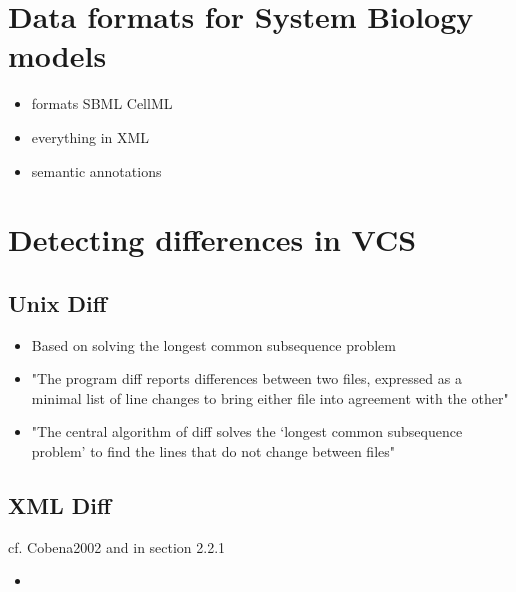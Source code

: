 \section{Data formats for System Biology models}
	\begin{itemize}
		\item formats
		\subitem SBML
		\subitem CellML
		\subitem \sedml
		\item everything in XML
		\item semantic annotations
	\end{itemize}

\section{Detecting differences in VCS}
	\subsection{Unix Diff}
	\begin{itemize}
		\item Based on solving the longest common subsequence problem
		\item "The program diff reports differences between two files, expressed as a minimal list of line changes to bring either file into agreement with the other" \cite{Hunt1976}
		\item "The central algorithm of diff solves the ‘longest common subsequence problem’ to find the lines that do not change between files" \cite{Hunt1976}
	\end{itemize}
	
	\subsection{XML Diff}
	cf. Cobena2002 and \cite{Waltemath2013} in section 2.2.1
	\begin{itemize}
		\item 
	\end{itemize}
	
